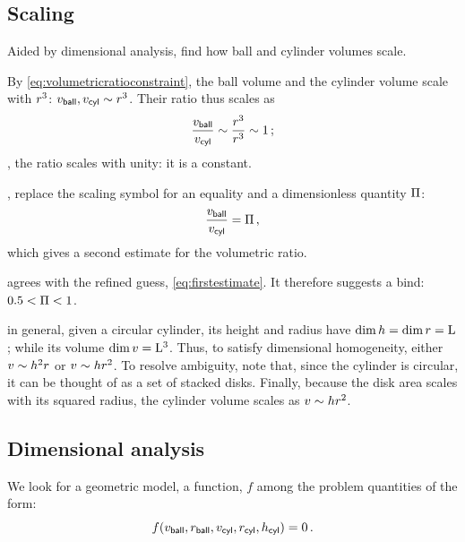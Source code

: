 

\subsection{Scaling} %
\label{sub:scaling}
%
 Aided by dimensional analysis, find how ball and cylinder volumes scale.

 By \cref{eq:volumetricratioconstraint}, the ball volume and the cylinder volume scale with $\radius^3$: $\vball,\vcyl\scale\radius^3$. Their ratio thus scales as
%
\begin{equation*}
  \dfrac{\vball}{\vcyl}\scale\dfrac{\radius^3}{\radius^3}\scale 1\,;
\end{equation*}
%
 \ie, the ratio scales with unity: it is a constant. 

, replace the scaling symbol for an equality and a dimensionless quantity $\kdim$:
%
\begin{equation}\label{eq:secondestimate}
  \dfrac{\vball}{\vcyl} = \kdim\,,
\end{equation}
%
which gives a second estimate for the volumetric ratio. 

  agrees with the refined guess, \cref{eq:firstestimate}. It therefore suggests a bind: $0.5 < \kdim < 1$.

 in general, given a circular cylinder, its height and radius have $\dim\height = \dim\radius = \phdim L$; while its volume $\dim\volume = \phdim{L^3}$. Thus, to satisfy dimensional homogeneity, either $\volume\scale\height^2\radius$ or $\volume\scale\height\radius^2$. To resolve ambiguity, note that, since the cylinder is circular, it can be thought of as a set of stacked disks. Finally, because the disk area scales with its squared radius, the cylinder volume scales as $\volume\scale\height\radius^2$.



\subsection{Dimensional analysis} %
\label{sub:dimensional_analysis}
%
 We look for a geometric model, a function, $f$ among the problem quantities of the form:
%
\begin{equation*}
  f\vat{\vball,\rball,\vcyl,\rcyl,\hcyl} = 0\,.
\end{equation*}

